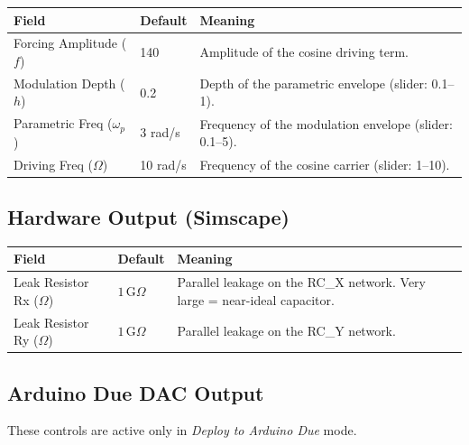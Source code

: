 \documentclass[12pt,a4paper]{article}
\begin{document}
\begin{center}
\begin{tabular}{llp{6.5cm}}
\toprule
\textbf{Field} & \textbf{Default} & \textbf{Meaning}\\
\midrule
Forcing Amplitude ($f$)      & 140   & Amplitude of the cosine driving term.\\
Modulation Depth ($h$)       & 0.2   & Depth of the parametric envelope (slider: 0.1--1).\\
Parametric Freq ($\omega_p$) & 3 rad/s & Frequency of the modulation envelope (slider: 0.1--5).\\
Driving Freq ($\Omega$)      & 10 rad/s & Frequency of the cosine carrier (slider: 1--10).\\
\bottomrule
\end{tabular}
\end{center}

\subsection{Hardware Output (Simscape)}

\begin{center}
\begin{tabular}{llp{6.5cm}}
\toprule
\textbf{Field} & \textbf{Default} & \textbf{Meaning}\\
\midrule
Leak Resistor Rx ($\Omega$) & $1\,\text{G}\Omega$ & Parallel leakage on the RC\_X network.  Very large = near-ideal capacitor.\\
Leak Resistor Ry ($\Omega$) & $1\,\text{G}\Omega$ & Parallel leakage on the RC\_Y network.\\
\bottomrule
\end{tabular}
\end{center}

\subsection{Arduino Due DAC Output}

These controls are active only in \textit{Deploy to Arduino Due} mode.
\end{document}
